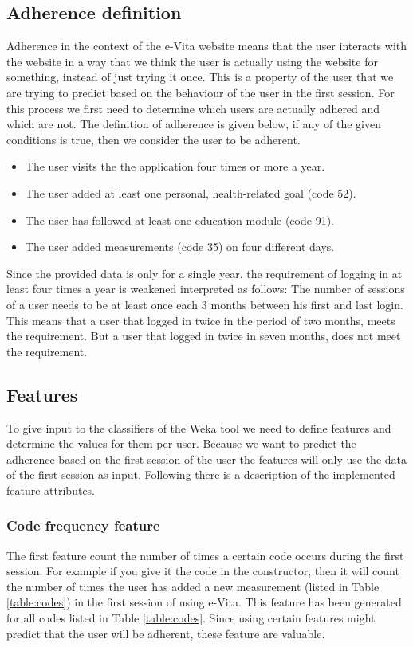 \subsection{Adherence definition}
Adherence in the context of the e-Vita website means that the user interacts with the website in a way that we think the user is actually using the website for something, instead of just trying it once. This is a property of the user that we are trying to predict based on the behaviour of the user in the first session. For this process we first need to determine which users are actually adhered and which are not. The definition of adherence is given below, if any of the given conditions is true, then we consider the user to be adherent.

\begin{itemize}
	\item The user visits the the application four times or more a year.
	\item The user added at least one personal, health-related goal (code 52).
	\item The user has followed at least one education module (code 91).
	\item The user added measurements (code 35) on four different days.
\end{itemize}

Since the provided data is only for a single year, the requirement of logging in at least four times a year is weakened interpreted as follows: The number of sessions of a user needs to be at least once each 3 months between his first and last login. This means that a user that logged in twice in the period of two months, meets the requirement. But a user that logged in twice in seven months, does not meet the requirement. 

\subsection{Features} \label{subsection:features}
To give input to the classifiers of the Weka tool we need to define features and determine the values for them per user. Because we want to predict the adherence based on the first session of the user the features will only use the data of the first session as input. Following there is a description of the implemented feature attributes.

\subsubsection{Code frequency feature}
The first feature count the number of times a certain code occurs during the first session. For example if you give it the code  in the constructor, then it will count the number of times the user has added a new measurement (listed in Table \ref{table:codes}) in the first session of using e-Vita. This feature has been generated for all codes listed in Table \ref{table:codes}. Since using certain features might predict that the user will be adherent, these feature are valuable.

